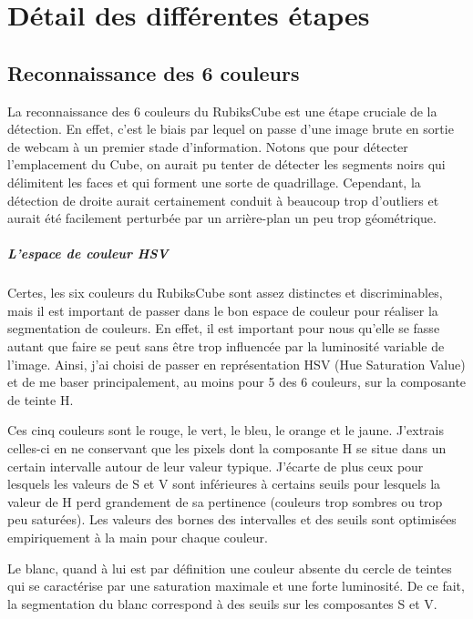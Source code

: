\documentclass[a4paper,11pt]{article}
\begin{document}
\section{Détail des différentes étapes}

\subsection{Reconnaissance des 6 couleurs}
La reconnaissance des 6 couleurs du RubiksCube est une étape cruciale de la détection. En effet, c'est le biais
par lequel on passe d'une image brute en sortie de webcam à un premier stade d'information. Notons que pour
détecter l'emplacement du Cube, on aurait pu tenter de détecter les segments noirs qui délimitent les faces et
qui forment une sorte de quadrillage. Cependant, la détection de droite aurait certainement conduit à beaucoup
trop d'outliers et aurait été facilement perturbée par un arrière-plan un peu trop géométrique.

\subparagraph{L'espace de couleur HSV} 
Certes, les six couleurs du RubiksCube sont assez distinctes et discriminables, mais il est important de passer
dans le bon espace de couleur pour réaliser la segmentation de couleurs. En effet, il est important pour nous
qu'elle se fasse autant que faire se peut sans être trop influencée par la luminosité variable de l'image.
Ainsi, j'ai choisi de passer en représentation HSV (Hue Saturation Value) et de me baser principalement,
au moins pour 5 des 6 couleurs, sur la composante de teinte H. 

Ces cinq couleurs sont le rouge, le vert, le bleu, le orange et le jaune. J'extrais celles-ci en ne conservant
que les pixels dont la composante H se situe dans un certain intervalle autour de leur valeur typique. J'écarte
de plus ceux pour lesquels les valeurs de S et V sont inférieures à certains seuils pour lesquels la valeur de 
H perd grandement de sa pertinence (couleurs trop sombres ou trop peu saturées). Les valeurs des bornes des
intervalles et des seuils sont optimisées empiriquement à la main pour chaque couleur.

Le blanc, quand à lui est par définition une couleur absente du cercle de teintes qui se caractérise par une 
saturation maximale et une forte luminosité. De ce fait, la segmentation du blanc correspond à des seuils sur
les composantes S et V.
\end{document}
